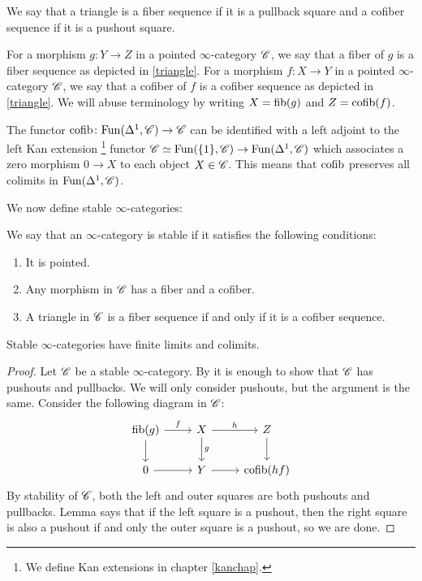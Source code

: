 \documentclass[../../thesis.tex]{subfiles}
\begin{document}
\begin{definition}
    We say that a triangle is a fiber sequence if it is a pullback square and a cofiber sequence if it is a pushout square.
\end{definition}
\begin{definition}[{\cite[Definition 1.1.1.6.]{HA}}]
    For a morphism $g\colon Y \to Z$ in a pointed $\infty$-category $\mathscr{C}$, we say that a fiber of $g$ is a fiber sequence as depicted in \ref{triangle}.
    For a morphism $f\colon X \to Y$ in a pointed $\infty$-category $\mathscr{C}$, we say that a cofiber of $f$ is a cofiber sequence as depicted in \ref{triangle}.
    We will abuse terminology by writing $X = \operatorname{fib}(g)$ and $Z=\operatorname{cofib}(f)$.
\end{definition}
\begin{remark}[{\cite[Remark 1.1.1.8.]{HA}}]
    The functor $\operatorname{cofib}\colon \mathrm{Fun}(\Delta^1, \mathscr{C})\to \mathscr{C}$ can be identified with a left adjoint to the left Kan extension \footnote{We define Kan extensions in chapter \ref{kanchap}.} functor $\mathscr{C} \simeq \mathrm{Fun}(\{1\}, \mathscr{C}) \to \mathrm{Fun}(\Delta^1, \mathscr{C})$ which associates a zero morphism $0 \to X$ to each object $X \in \mathscr{C}$.
    This means that $\operatorname{cofib}$ preserves all colimits in $\mathrm{Fun}(\Delta^1, \mathscr{C})$.
\end{remark}
We now define stable $\infty$-categories:
\begin{definition}[{\cite[Definition 1.1.1.9.]{HA}}]
    We say that an $\infty$-category is stable if it satisfies the following conditions:
    \begin{enumerate}
        \item It is pointed.
        \item Any morphism in $\mathscr{C}$ has a fiber and a cofiber.
        \item A triangle in $\mathscr{C}$ is a fiber sequence if and only if it is a cofiber sequence.
    \end{enumerate}
\end{definition}
\begin{proposition}
    Stable $\infty$-categories have finite limits and colimits.
\end{proposition}
\begin{proof}
    Let $\mathscr{C}$ be a stable $\infty$-category.
    By \cite[Corollary 4.4.2.4.]{HTT} it is enough to show that $\mathscr{C}$ has pushouts and pullbacks.
    We will only consider pushouts, but the argument is the same.
    Consider the following diagram in $\mathscr{C}$:
    \[\begin{tikzcd}
            {\fib(g)} & X & Z \\
            0 & Y & {\cofib(hf)}
            \arrow["f", from=1-1, to=1-2]
            \arrow[from=2-1, to=2-2]
            \arrow["g", from=1-2, to=2-2]
            \arrow[from=1-1, to=2-1]
            \arrow[from=2-2, to=2-3]
            \arrow["h", from=1-2, to=1-3]
            \arrow[from=1-3, to=2-3]
        \end{tikzcd}\]
    By stability of $\mathscr{C}$, both the left and outer squares are both pushouts and pullbacks.
    Lemma \cite[4.4.2.1.]{HTT} says that if the left square is a pushout, then the right square is also a pushout if and only the outer square is a pushout, so we are done.
\end{proof}
\end{document}
